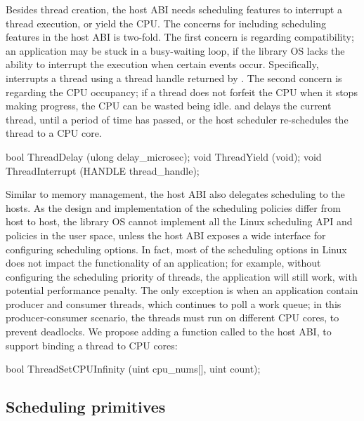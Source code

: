 Besides thread creation,
the host ABI needs scheduling features to interrupt a thread execution,
or yield the CPU.
The concerns for including scheduling features
in the host ABI
is two-fold.
The first concern is regarding compatibility;
an application may be stuck in a busy-waiting loop, if the library OS lacks the ability to interrupt the execution when certain events occur.
Specifically,  interrupts a thread using a thread handle
returned by .
The second concern is regarding the CPU occupancy;
if a thread does not forfeit the CPU when it stops making progress,
the CPU can be wasted being idle.
 and 
delays the current thread, until a period of time has passed, or the host scheduler re-schedules the thread to a CPU core.



\begin{paldef}
bool ThreadDelay     (ulong delay_microsec);
void ThreadYield     (void);
void ThreadInterrupt (HANDLE thread_handle);
\end{paldef}



Similar to memory management, the host ABI also delegates scheduling to the hosts.
As the design and implementation of the scheduling policies
differ from host to host,
the library OS cannot implement all the Linux scheduling API and policies in the user space,
unless the host ABI exposes a wide interface
for configuring scheduling options.
In fact, most of the scheduling options in Linux does not impact
the functionality of an application;
for example, without configuring the scheduling priority of threads,
the application will still work,
with potential performance penalty.
The only exception is when an application contain
producer and consumer threads,
which continues to poll a work queue;
in this producer-consumer scenario,
the threads must run on different CPU cores, to prevent deadlocks.
We propose adding a function called  to the host ABI,
to support binding a thread to CPU cores:

\begin{paldef}
bool ThreadSetCPUInfinity (uint cpu_nums[], uint count);
\end{paldef}


\subsection*{Scheduling primitives}


